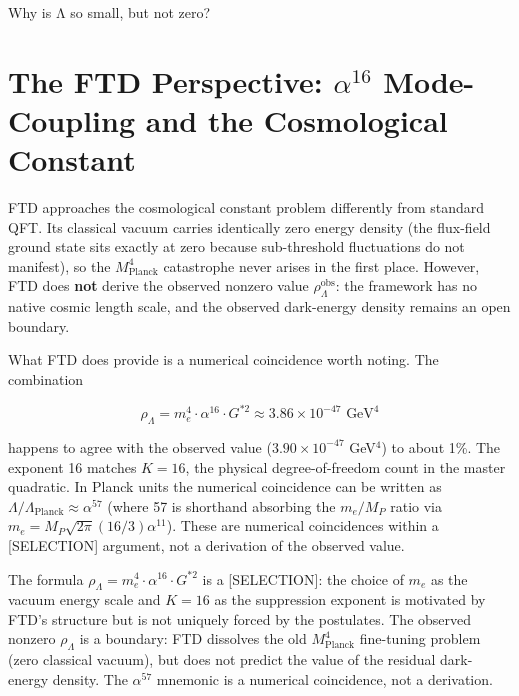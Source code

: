 \documentclass[
  11pt,
  letterpaper,
  twoside,
  openright]{book}
\begin{document}
Why is Λ so small, but not zero?

\section{\texorpdfstring{The FTD Perspective: \(\alpha^{16}\)
Mode-Coupling and the Cosmological
Constant}{The FTD Perspective: \textbackslash alpha\^{}\{16\} Mode-Coupling and the Cosmological Constant}}\label{the-ftd-perspective-alpha16-mode-coupling-and-the-cosmological-constant}

FTD approaches the cosmological constant problem differently from
standard QFT. Its classical vacuum carries identically zero energy
density (the flux-field ground state sits exactly at zero because
sub-threshold fluctuations do not manifest), so the
\(M_\text{Planck}^4\) catastrophe never arises in the first place.
However, FTD does \textbf{not} derive the observed nonzero value
\(\rho_\Lambda^\text{obs}\): the framework has no native cosmic length
scale, and the observed dark-energy density remains an open boundary.

What FTD does provide is a numerical coincidence worth noting. The
combination

\[\rho_\Lambda = m_e^4 \cdot \alpha^{16} \cdot G^{*2} \approx 3.86 \times 10^{-47} \text{ GeV}^4\]

happens to agree with the observed value (\(3.90 \times 10^{-47}\)
GeV\(^4\)) to about 1\%. The exponent 16 matches \(K = 16\), the
physical degree-of-freedom count in the master quadratic. In Planck
units the numerical coincidence can be written as
\(\Lambda / \Lambda_\text{Planck} \approx \alpha^{57}\) (where 57 is
shorthand absorbing the \(m_e / M_P\) ratio via
\(m_e = M_P \sqrt{2\pi}(16/3)\alpha^{11}\)). These are numerical
coincidences within a {[}SELECTION{]} argument, not a derivation of the
observed value.

\begin{tcolorbox}[enhanced jigsaw, coltitle=black, colbacktitle=quarto-callout-important-color!10!white, toprule=.15mm, colframe=quarto-callout-important-color-frame, arc=.35mm, opacityback=0, bottomtitle=1mm, toptitle=1mm, breakable, colback=white, titlerule=0mm, opacitybacktitle=0.6, title=\textcolor{quarto-callout-important-color}{\faExclamation}\hspace{0.5em}{Epistemic status}, rightrule=.15mm, bottomrule=.15mm, leftrule=.75mm, left=2mm]

The formula \(\rho_\Lambda = m_e^4 \cdot \alpha^{16} \cdot G^{*2}\) is a
{[}SELECTION{]}: the choice of \(m_e\) as the vacuum energy scale and
\(K = 16\) as the suppression exponent is motivated by FTD's structure
but is not uniquely forced by the postulates. The observed nonzero
\(\rho_\Lambda\) is a boundary: FTD dissolves the old
\(M_\text{Planck}^4\) fine-tuning problem (zero classical vacuum), but
does not predict the value of the residual dark-energy density. The
\(\alpha^{57}\) mnemonic is a numerical coincidence, not a derivation.

\end{tcolorbox}
\end{document}

